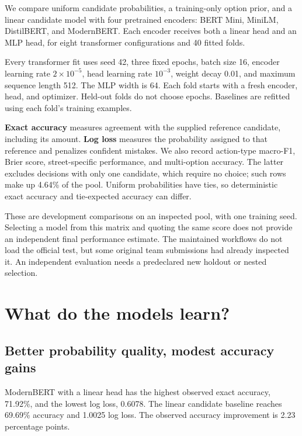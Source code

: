 \documentclass[
  11pt,
  letterpaper,
]{article}
\begin{document}
We compare uniform candidate probabilities, a training-only option
prior, and a linear candidate model with four pretrained encoders: BERT
Mini, MiniLM, DistilBERT, and ModernBERT. Each encoder receives both a
linear head and an MLP head, for eight transformer configurations and 40
fitted folds.

Every transformer fit uses seed 42, three fixed epochs, batch size 16,
encoder learning rate \(2\times10^{-5}\), head learning rate
\(10^{-3}\), weight decay 0.01, and maximum sequence length 512. The MLP
width is 64. Each fold starts with a fresh encoder, head, and optimizer.
Held-out folds do not choose epochs. Baselines are refitted using each
fold's training examples.

\textbf{Exact accuracy} measures agreement with the supplied reference
candidate, including its amount. \textbf{Log loss} measures the
probability assigned to that reference and penalizes confident mistakes.
We also record action-type macro-F1, Brier score, street-specific
performance, and multi-option accuracy. The latter excludes decisions
with only one candidate, which require no choice; such rows make up
4.64\% of the pool. Uniform probabilities have ties, so deterministic
exact accuracy and tie-expected accuracy can differ.

These are development comparisons on an inspected pool, with one
training seed. Selecting a model from this matrix and quoting the same
score does not provide an independent final performance estimate. The
maintained workflows do not load the official test, but some original
team submissions had already inspected it. An independent evaluation
needs a predeclared new holdout or nested selection.

\section{What do the models learn?}\label{what-do-the-models-learn}

\subsection{Better probability quality, modest accuracy
gains}\label{better-probability-quality-modest-accuracy-gains}

ModernBERT with a linear head has the highest observed exact accuracy,
71.92\%, and the lowest log loss, 0.6078. The linear candidate baseline
reaches 69.69\% accuracy and 1.0025 log loss. The observed accuracy
improvement is 2.23 percentage points.
\end{document}
